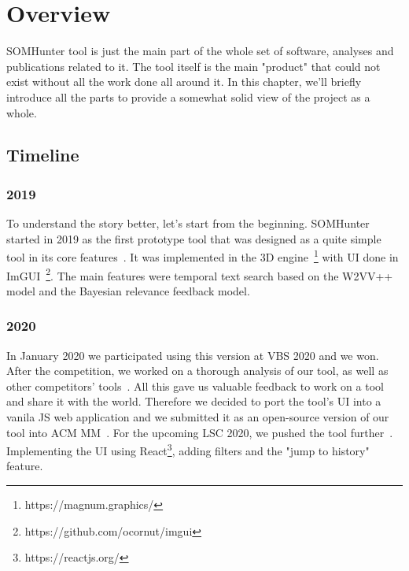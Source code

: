 \chapter{Overview}
\label{overview}

SOMHunter tool is just the main part of the whole set of software, analyses and publications related to it. The tool itself is the main "product" that could not exist without all the work done all around it. In this chapter, we'll briefly introduce all the parts to provide a somewhat solid view of the project as a whole.

\section{Timeline}

\subsection{2019}
To understand the story better, let's start from the beginning. SOMHunter started in 2019 as the first prototype tool that was designed as a quite simple tool in its core features~\cite{kratochvil2020som}. It was implemented in the 3D engine~\footnote{https://magnum.graphics/} with UI done in ImGUI~\footnote{https://github.com/ocornut/imgui}. The main features were temporal text search based on the W2VV++ model and the Bayesian relevance feedback model. 

\subsection{2020}
In January 2020 we participated using this version at VBS 2020 and we won. After the competition, we worked on a thorough analysis of our tool, as well as other competitors' tools~\cite{lokovc2021reign}. All this gave us valuable feedback to work on a tool and share it with the world. Therefore we decided to port the tool's UI into a vanila JS web application and we submitted it as an open-source version of our tool into ACM MM~\cite{kratochvil2020somhunter}. For the upcoming LSC 2020, we pushed the tool further~\cite{mejzlik2020somhunter}. Implementing the UI using React\footnote{https://reactjs.org/}, adding filters and the "jump to history" feature.

